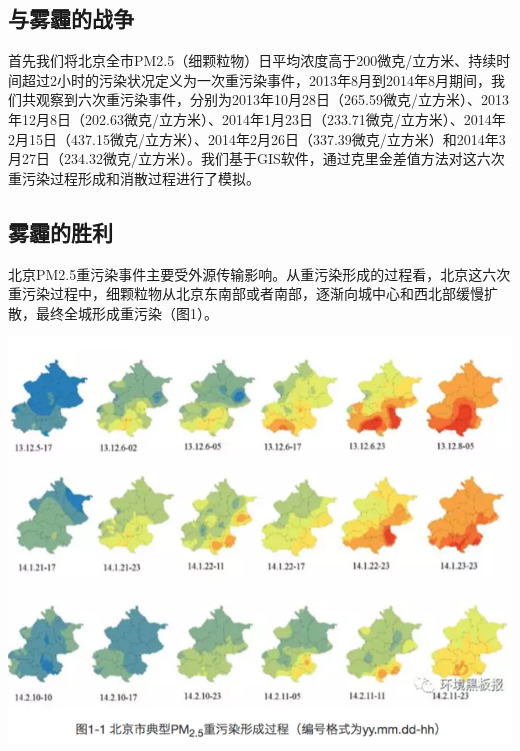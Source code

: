 \documentclass[]{book}
\begin{document}
\hypertarget{ux4e0eux96feux973eux7684ux6218ux4e89}{%
\subsection{与雾霾的战争}\label{ux4e0eux96feux973eux7684ux6218ux4e89}}

首先我们将北京全市PM2.5（细颗粒物）日平均浓度高于200微克/立方米、持续时间超过2小时的污染状况定义为一次重污染事件，2013年8月到2014年8月期间，我们共观察到六次重污染事件，分别为2013年10月28日（265.59微克/立方米）、2013年12月8日（202.63微克/立方米）、2014年1月23日（233.71微克/立方米）、2014年2月15日（437.15微克/立方米）、2014年2月26日（337.39微克/立方米）和2014年3月27日（234.32微克/立方米）。我们基于GIS软件，通过克里金差值方法对这六次重污染过程形成和消散过程进行了模拟。

\hypertarget{ux96feux973eux7684ux80dcux5229}{%
\subsection{雾霾的胜利}\label{ux96feux973eux7684ux80dcux5229}}

北京PM2.5重污染事件主要受外源传输影响。从重污染形成的过程看，北京这六次重污染过程中，细颗粒物从北京东南部或者南部，逐渐向城中心和西北部缓慢扩散，最终全城形成重污染（图1）。

\includegraphics[width=8.33in]{images/windhaze1}
\end{document}
